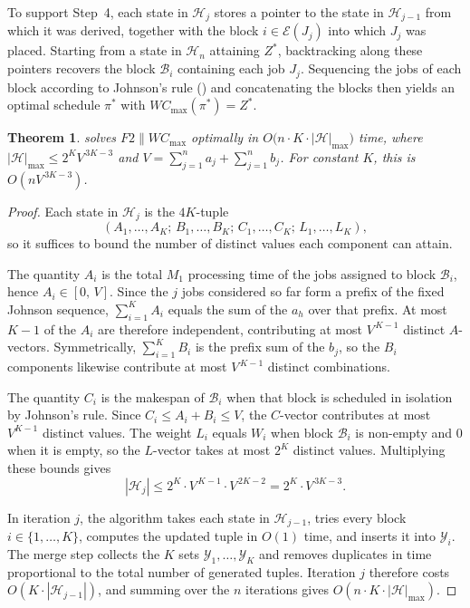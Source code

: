 \documentclass[12pt]{article}
\newtheorem{theorem}{Theorem}[section]
\begin{document}
\begin{sloppypar}
To support Step~4, each state in $\mathscr{H}_j$ stores a pointer to the state in $\mathscr{H}_{j-1}$
from which it was derived, together with the block $i \in \mathcal{E}(J_j)$ into which $J_j$ was
placed. Starting from a state in $\mathscr{H}_n$ attaining $Z^{*}$, backtracking along these pointers
recovers the block $\mathcal{B}_i$ containing each job $J_j$. Sequencing the jobs of each block
according to Johnson's rule () and concatenating the blocks then yields
an optimal schedule $\pi^{*}$ with $W C_{\max}(\pi^{*}) = Z^{*}$.

\begin{theorem}\label{thm:complexity}
 solves $F2 \parallel W C_{\max}$ optimally in
$O\bigl(n \cdot K \cdot |\mathscr{H}|_{\max}\bigr)$ time, where
$|\mathscr{H}|_{\max} \le 2^{K}V^{\,3K-3}$ and $V = \sum_{j=1}^{n}a_j + \sum_{j=1}^{n}b_j$.
For constant $K$, this is $O(nV^{\,3K-3})$.
\end{theorem}

\begin{proof}
Each state in $\mathscr{H}_j$ is the $4K$-tuple
\[
(A_1,\dots,A_K;\, B_1,\dots,B_K;\, C_1,\dots,C_K;\, L_1,\dots,L_K),
\]
so it suffices to bound the number of distinct values each component can attain.

The quantity $A_i$ is the total $M_1$ processing time of the jobs assigned to block
$\mathcal{B}_i$, hence $A_i \in [0,\,V]$. Since the $j$ jobs considered so far form a prefix of the
fixed Johnson sequence, $\sum_{i=1}^{K} A_i$ equals the sum of the $a_h$ over that prefix. At most
$K-1$ of the $A_i$ are therefore independent, contributing at most $V^{\,K-1}$ distinct
$A$-vectors. Symmetrically, $\sum_{i=1}^{K} B_i$ is the prefix sum of the $b_j$, so the $B_i$
components likewise contribute at most $V^{\,K-1}$ distinct combinations.

The quantity $C_i$ is the makespan of $\mathcal{B}_i$ when that block is scheduled in isolation by
Johnson's rule. Since $C_i \le A_i + B_i \le V$, the $C$-vector contributes at most $V^{K-1}$
distinct values. The weight $L_i$ equals $W_i$ when block $\mathcal{B}_i$ is non-empty and $0$ when
it is empty, so the $L$-vector takes at most $2^K$ distinct values. Multiplying these bounds gives
\[
|\mathscr{H}_{j}| \le 2^K \cdot V^{\,K-1} \cdot V^{\,2K-2} = 2^K \cdot V^{\,3K-3}.
\]

In iteration $j$, the algorithm takes each state in $\mathscr{H}_{j-1}$, tries every block
$i \in \{1,\dots,K\}$, computes the updated tuple in $O(1)$ time, and inserts it into
$\mathcal{Y}_i$. The merge step collects the $K$ sets $\mathcal{Y}_1,\dots,\mathcal{Y}_K$ and removes
duplicates in time proportional to the total number of generated tuples. Iteration $j$ therefore
costs $O(K \cdot |\mathscr{H}_{j-1}|)$, and summing over the $n$ iterations gives
$O(n \cdot K \cdot |\mathscr{H}|_{\max})$.


\end{proof}
\end{sloppypar}
\end{document}

